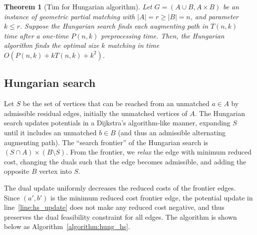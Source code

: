 \documentclass[11pt]{article}
\theoremstyle{plain}
\newtheorem{theorem}{Theorem}
\begin{document}
\begin{theorem}[Tim for Hungarian algorithm]
\label{theorem:hung_orig}
Let $G = (A \cup B, A \times B)$ be an instance of geometric partial matching
with $|A| = r \geq |B| = n$, and parameter $k \leq r$.
Suppose the Hungarian search finds each augmenting path in $T(n, k)$ time after
a one-time $P(n, k)$ preprocessing time.
Then, the Hungarian algorithm finds the optimal size $k$ matching in time
$O(P(n, k) + k T(n, k) + k^2)$.
\end{theorem}

\subsection{Hungarian search}

Let $S$ be the set of vertices that can be reached from an unmatched $a \in A$
by admissible residual edges, initially the unmatched vertices of $A$.
The Hungarian search updates potentials in a Dijkstra's algorithm-like manner,
expanding $S$ until it includes an unmatched $b \in B$ (and thus an admissible
alternating augmenting path).
The ``search frontier'' of the Hungarian search is
$(S \cap A) \times (B \setminus S)$.
From the frontier, we \emph{relax} the edge with minimum reduced cost, changing
the duals such that the edge becomes admissible, and adding the opposite $B$
vertex into $S$.

The dual update uniformly decreases the reduced costs of the frontier edges.
Since $(a', b')$ is the minimum reduced cost frontier edge, the potential
update in line~\ref{line:hs_update} does not make any reduced cost negative,
and thus preserves the dual feasibility constraint for all edges.
The algorithm is shown below as Algorithm~\ref{algorithm:hung_hs}.
\end{document}
